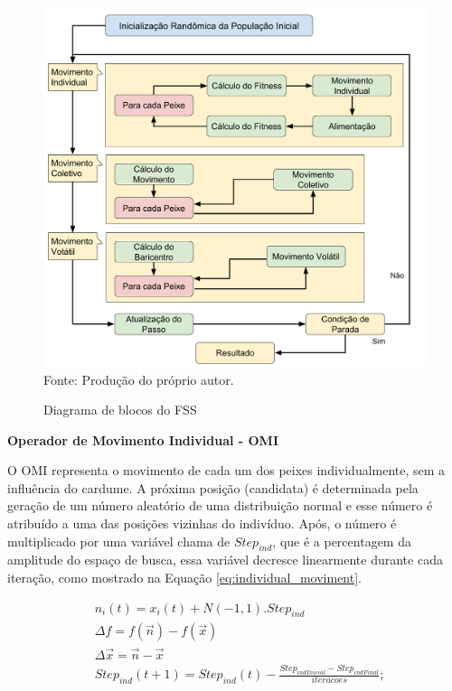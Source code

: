 \begin{figure}[!htb]
	\caption{Diagrama de blocos do FSS}
	\centering
	\includegraphics[scale=0.4]{images/diagrama_blocos.png}
	\label{fig:pseudo_code}{\\Fonte: Produção do próprio autor.}
\end{figure}

\noindent \textbf{Operador de Movimento Individual - OMI}

O OMI representa o movimento de cada um dos peixes individualmente, sem a influência do cardume. A próxima posição (candidata) é determinada pela geração de um número aleatório de uma distribuição normal e esse número é atribuído a uma das posições vizinhas do indivíduo. Após, o número é multiplicado por uma variável chama de $Step_{ind}$, que é a percentagem da amplitude do espaço de busca, essa variável decresce linearmente durante cada iteração, como mostrado na Equação \ref{eq:individual_moviment}.

\begin{equation}
\label{eq:individual_moviment}
\begin{split}
& n_i(t) = x_i(t) + N(-1,1).Step_{ind} \\
& \Delta f = f(\vec{n}) - f(\vec{x}) \\
& \Delta \vec{x} = \vec{n} - \vec{x} \\
& Step_{ind}(t+1) = Step_{ind}(t) - \frac{Step_{indInicial} - Step_{indFinal}}{iteracoes};
\end{split}
\end{equation}

